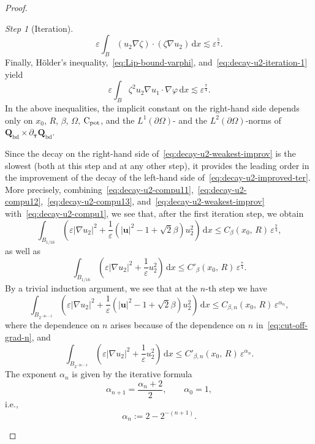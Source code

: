 \documentclass[a4paper, 11pt, twoside, leqno]{article}
\theoremstyle{definition}              %
\theoremstyle{remark}                  %
\newtheorem{step}{Step}
\newcommand{\abs}[1]{\left| #1 \right|}                             %
\renewcommand{\d}{\mathrm{d}}
\newcommand{\Q}{\mathbf{Q}}
\renewcommand{\u}{\mathbf{u}}
\newcommand{\eps}{\varepsilon}
\newcommand{\Cpot}{{\rm C}_{\rm pot}}
\newcommand{\ttau}{{\boldsymbol{\tau}}}
\newcommand{\Qb}{\Q_{\mathrm{bd}}}
\begin{document}
\begin{proof}
\begin{step}[Iteration]
    \begin{equation}\label{eq:decay-u2-compu13}
        \eps \int_B (u_2 \nabla \zeta)\cdot (\zeta \nabla u_2) \,{\d}x \lesssim \eps^\frac{5}{2}. 
    \end{equation}
    Finally, H\"{o}lder's inequality,~\eqref{eq:Lip-bound-varphi}, 
    and~\eqref{eq:decay-u2-iteration-1} yield 
    \begin{equation}\label{eq:decay-u2-weakest-improv}
        \eps \int_B \zeta^2 u_2 \nabla u_1\cdot \nabla\varphi\,{\d}x \lesssim \eps^\frac{7}{4}. 
    \end{equation}
    In the above inequalities, the implicit constant on the right-hand side depends only on $x_0$, $R$, $\beta$, $\Omega$, $\Cpot$, and the $L^1(\partial \Omega)$- and the $L^2(\partial \Omega)$-norms of $\Qb \times \partial_\ttau \Qb$. 
    
    Since the decay on the right-hand side of~\eqref{eq:decay-u2-weakest-improv} is the slowest (both at this step and at any other step), it provides the leading order in the improvement of the decay of the left-hand side of~\eqref{eq:decay-u2-improved-ter}. 
    More precisely, combining~\eqref{eq:decay-u2-compu11},~\eqref{eq:decay-u2-compu12},~\eqref{eq:decay-u2-compu13}, and~\eqref{eq:decay-u2-weakest-improv} with~\eqref{eq:decay-u2-compu1}, we see that, after the first iteration step, we obtain  
    \begin{equation}\label{eq:decay-u2-improved-4}
                \int_{B_{1/16}} \left( \eps \abs{\nabla u_2}^2 + \frac{1}{\eps}\left( \abs{\u}^2 - 1 + \sqrt{2}\beta \right) u_2^2 \right)\,{\d}x 
        \leq C_\beta(x_0,\,R) \, \eps^\frac{7}{4}, 
    \end{equation}
    as well as 
    \[
        \int_{B_{1/16}} \left( \eps \abs{\nabla u_2}^2 + \frac{1}{\eps} u_2^2 \right)\,{\d}x 
        \leq C'_\beta(x_0,\,R) \, \eps^\frac{7}{4}.
    \]    
    By a trivial induction argument, we see that at the $n$-th step we have
    \begin{equation}\label{eq:decay-u2-improved-n}
        \int_{B_{2^{-2n-2}}} \left( \eps \abs{\nabla u_2}^2 + \frac{1}{\eps}\left( \abs{\u}^2 - 1 + \sqrt{2}\beta \right) u_2^2 \right)\,{\d}x 
        \leq C_{\beta,n}(x_0,\,R) \, \eps^{\alpha_n},
    \end{equation}
    where the dependence on $n$ arises because of the dependence on $n$ in~\eqref{eq:cut-off-grad-n}, and
    \begin{equation}\label{eq:decay-u2-improved-n-bis}
        \int_{B_{2^{-2n-2}}} \left( \eps \abs{\nabla u_2}^2 + \frac{1}{\eps} u_2^2 \right)\,{\d}x 
        \leq C'_{\beta,n}(x_0,\,R) \, \eps^{\alpha_n}. 
    \end{equation}
    The exponent $\alpha_n$ is given by the iterative formula
    \[
    	\alpha_{n+1} = \frac{\alpha_n + 2}{2}, \qquad \alpha_0 = 1,
    \]
    i.e., 
    \begin{equation}\label{eq:alpha_n}
        \alpha_n := 2-2^{-(n+1)}.
    \end{equation}
\end{step}


\end{proof}
\end{document}
